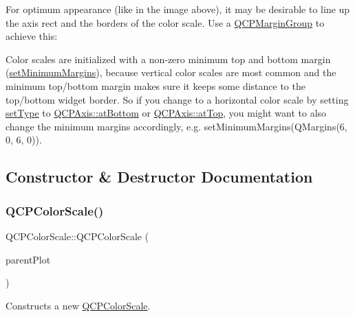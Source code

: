 For optimum appearance (like in the image above), it may be desirable to line up the axis rect and the borders of the color scale. Use a \mbox{\hyperlink{class_q_c_p_margin_group}{Q\+C\+P\+Margin\+Group}} to achieve this\+: 
\begin{DoxyCodeInclude}
\end{DoxyCodeInclude}
 Color scales are initialized with a non-\/zero minimum top and bottom margin (\mbox{\hyperlink{class_q_c_p_layout_element_a0a8a17abc16b7923159fcc7608f94673}{set\+Minimum\+Margins}}), because vertical color scales are most common and the minimum top/bottom margin makes sure it keeps some distance to the top/bottom widget border. So if you change to a horizontal color scale by setting \mbox{\hyperlink{class_q_c_p_color_scale_a1bf9bdb291927c422dd66b404b206f1f}{set\+Type}} to \mbox{\hyperlink{class_q_c_p_axis_ae2bcc1728b382f10f064612b368bc18aa220d68888516b6c3b493d144f1ba438f}{Q\+C\+P\+Axis\+::at\+Bottom}} or \mbox{\hyperlink{class_q_c_p_axis_ae2bcc1728b382f10f064612b368bc18aac0ece2b680d3f545e701f75af1655977}{Q\+C\+P\+Axis\+::at\+Top}}, you might want to also change the minimum margins accordingly, e.\+g. {\ttfamily set\+Minimum\+Margins(\+Q\+Margins(6, 0, 6, 0))}. 

\subsection{Constructor \& Destructor Documentation}
\mbox{\label{class_q_c_p_color_scale_aa8debce1be38b54287c04d4f584394b4}} 
\subsubsection{\texorpdfstring{Q\+C\+P\+Color\+Scale()}{QCPColorScale()}}
{\footnotesize\ttfamily Q\+C\+P\+Color\+Scale\+::\+Q\+C\+P\+Color\+Scale (\begin{DoxyParamCaption}\item[{\mbox{\hyperlink{class_q_custom_plot}{Q\+Custom\+Plot}} $\ast$}]{parent\+Plot }\end{DoxyParamCaption})\hspace{0.3cm}{\ttfamily [explicit]}}

Constructs a new \mbox{\hyperlink{class_q_c_p_color_scale}{Q\+C\+P\+Color\+Scale}}. 

